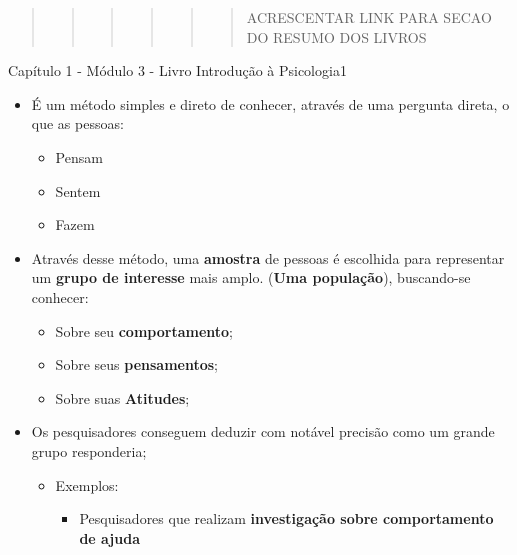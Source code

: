 \documentclass[
]{book}
\providecommand{\tightlist}{%
  \setlength{\itemsep}{0pt}\setlength{\parskip}{0pt}}
\begin{document}
\begin{quote}
\begin{quote}
\begin{quote}
\begin{quote}
\begin{quote}
\begin{quote}
ACRESCENTAR LINK PARA SECAO DO RESUMO DOS LIVROS
\end{quote}
\end{quote}
\end{quote}
\end{quote}
\end{quote}
\end{quote}

Capítulo 1 - Módulo 3 - Livro Introdução à Psicologia1

\begin{itemize}
\tightlist
\item
  É um método simples e direto de conhecer, através de uma pergunta direta, o que as pessoas:

  \begin{itemize}
  \tightlist
  \item
    Pensam
  \item
    Sentem
  \item
    Fazem
  \end{itemize}
\item
  Através desse método, uma \textbf{amostra} de pessoas é escolhida para representar um \textbf{grupo de interesse} mais amplo. (\textbf{Uma população}), buscando-se conhecer:

  \begin{itemize}
  \tightlist
  \item
    Sobre seu \textbf{comportamento};
  \item
    Sobre seus \textbf{pensamentos};
  \item
    Sobre suas \textbf{Atitudes};
  \end{itemize}
\item
  Os pesquisadores conseguem deduzir com notável precisão como um grande grupo responderia;

  \begin{itemize}
  \tightlist
  \item
    Exemplos:

    \begin{itemize}
    \tightlist
    \item
      Pesquisadores que realizam \textbf{investigação sobre comportamento de ajuda}


\end{itemize}
\end{itemize}
\end{itemize}
\end{document}

